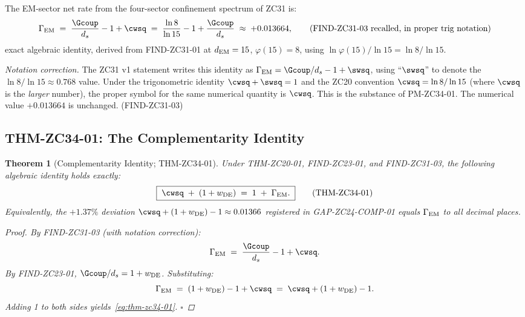 \documentclass[12pt, a4paper]{article}
\newtheorem{theorem}{Theorem}[section]
\begin{document}
\begin{formalbox}[title={FIND-ZC31-03 (recalled, with notation
  correction): EM-sector net rate}]
The EM-sector net rate from the four-sector confinement spectrum
of ZC31 is:
\begin{equation}
  \Gamma_{\rm EM} \;=\; \frac{\Gcoup}{d_s} - 1 + \cwsq
                \;=\; \frac{\ln 8}{\ln 15} - 1 + \frac{\Gcoup}{d_s}
                \;\approx\; +0.013664,
  \tag{FIND-ZC31-03 recalled, in proper trig notation}
  \label{eq:zc31}
\end{equation}
exact algebraic identity, derived from FIND-ZC31-01 at
$d_{\rm EM} = 15$, $\varphi(15) = 8$, using
$\ln\varphi(15)/\ln 15 = \ln 8/\ln 15$.

\medskip
\textit{Notation correction.} The ZC31 v1 statement writes this
identity as $\Gamma_{\rm EM} = \Gcoup/d_s - 1 + \swsq$, using
``$\swsq$'' to denote the $\ln 8/\ln 15 \approx 0.768$ value.
Under the trigonometric identity $\cwsq + \swsq = 1$ and the
ZC20 convention $\cwsq = \ln 8/\ln 15$ (where $\cwsq$ is the
\emph{larger} number), the proper symbol for the same numerical
quantity is $\cwsq$. This is the substance of PM-ZC34-01.
The numerical value $+0.013664$ is unchanged.
\hfill\textup{(FIND-ZC31-03)}
\end{formalbox}

\subsection{THM-ZC34-01: The Complementarity Identity}
\label{sec:thm-01}

\begin{theorem}[Complementarity Identity; THM-ZC34-01]
\label{thm:zc34-01}
Under THM-ZC20-01, FIND-ZC23-01, and FIND-ZC31-03, the
following algebraic identity holds exactly:
\begin{equation}
  \boxed{\;\cwsq \;+\; (1+w_{\rm DE}) \;=\; 1 \;+\; \Gamma_{\rm EM}.\;}
  \tag{THM-ZC34-01}\label{eq:thm-zc34-01}
\end{equation}
Equivalently, the $+1.37\%$ deviation
$\cwsq + (1+w_{\rm DE}) - 1 \approx 0.01366$ registered in
GAP-ZC24-COMP-01 equals $\Gamma_{\rm EM}$ to all decimal places.

\begin{proof}
By FIND-ZC31-03 (with notation correction):
\[
  \Gamma_{\rm EM} \;=\; \frac{\Gcoup}{d_s} - 1 + \cwsq.
\]
By FIND-ZC23-01, $\Gcoup/d_s = 1 + w_{\rm DE}$. Substituting:
\[
  \Gamma_{\rm EM} \;=\; (1+w_{\rm DE}) - 1 + \cwsq
                 \;=\; \cwsq + (1+w_{\rm DE}) - 1.
\]
Adding 1 to both sides yields~\eqref{eq:thm-zc34-01}.
\hfill$\square$
\end{proof}
\end{theorem}
\end{document}
